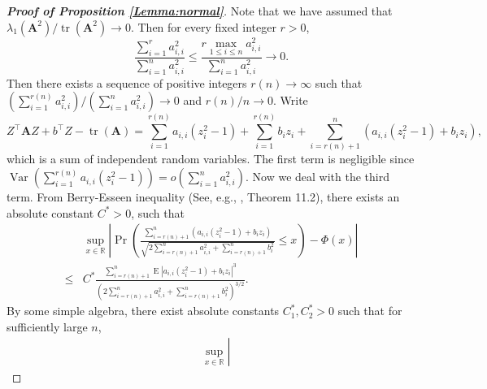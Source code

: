 \documentclass[smallextended]{svjour3}       %
\DeclareMathOperator{\mytr}{tr}
\DeclareMathOperator{\myE}{E}
\DeclareMathOperator{\myVar}{Var}
\newcommand{\BA}{\mathbf{A}}    \newcommand{\BB}{\mathbf{B}}    \newcommand{\BC}{\mathbf{C}}    \newcommand{\BD}{\mathbf{D}}    \newcommand{\BE}{\mathbf{E}}    \newcommand{\BF}{\mathbf{F}}    \newcommand{\BG}{\mathbf{G}}    \newcommand{\BH}{\mathbf{H}}    \newcommand{\BI}{\mathbf{I}}    \newcommand{\BJ}{\mathbf{J}}    \newcommand{\BK}{\mathbf{K}}    \newcommand{\BL}{\mathbf{L}}
\begin{document}
\begin{proof}[\textbf{Proof of Proposition \ref{Lemma:normal}}]
Note that we have assumed that $\lambda_1(\BA^2)/\mytr(\BA^2)\to 0$.
Then for every fixed integer $r>0$,
\begin{equation*}
    \frac{
        \sum_{i=1}^r a_{i,i}^2 
    }{
        \sum_{i=1}^n a_{i,i}^2 
    }
    \leq
    \frac{
        r \max_{1\leq i\leq n} a_{i,i}^2 
    }{
        \sum_{i=1}^n a_{i,i}^2 
    }
    \to 0.
\end{equation*}
Then there exists a sequence of positive integers $r(n)\to \infty$ such that   
    ${
        \left( 
        \sum_{i=1}^{r(n)} a_{i,i}^2 
        \right)
    }/{
        \left( 
        \sum_{i=1}^n a_{i,i}^2 
        \right)
    }
\to 0$ and $r(n)/n\to 0$.
    Write
    \begin{equation*}
        Z^\top \BA Z + b^\top Z - \mytr(\BA)
        =
        \sum_{i=1}^{r(n)} a_{i,i}(z_i^2-1)
        +
        \sum_{i=1}^{r(n)} b_i z_i
        +
        \sum_{i=r(n)+1}^n
        \left( 
        a_{i,i}(z_i^2-1) + b_i z_i
    \right),
    \end{equation*}
    which is a sum of independent random variables.
    The first term is negligible since $\myVar ( 
        \sum_{i=1}^{r(n)} a_{i,i}(z_i^2-1)
    )=o(\sum_{i=1}^n a_{i,i}^2)$.
    Now we deal with the third term.
    From Berry-Esseen inequality (See, e.g., \cite{book:336898}, Theorem 11.2), there exists an absolute constant $C^*>0$, such that
    \begin{equation*}
        \begin{split}
        &\sup_{x\in \mathbb R}\left|
        \Pr\left( 
        \frac{
            \sum_{i=r(n)+1}^n
        \left( 
        a_{i,i}(z_i^2-1) + b_i z_i
    \right)
}{
    \sqrt{2\sum_{i=r(n)+1}^n a_{i,i}^2 + \sum_{i=r(n)+1}^n b_{i}^2}
}
\leq x
    \right)
    -\Phi(x)
    \right|
    \\
    \leq&
    C^*
    \frac{
        \sum_{i=r(n)+1}^n
        \myE
        \left| 
        a_{i,i}(z_i^2-1) + b_i z_i
    \right|^3
    }{
        \left( 2\sum_{i=r(n)+1}^n a_{i,i}^2 + \sum_{i=r(n)+1}^n b_{i}^2 \right)^{3/2}
    }
    .
        \end{split}
    \end{equation*}
    By some simple algebra,
    there exist absolute constants $C_1^*,C_2^*>0$ such that for sufficiently large $n$,
    \begin{equation*}
        \begin{split}
        &\sup_{x\in \mathbb R}\left|

\end{split}
\end{equation*}
\end{proof}
\end{document}
